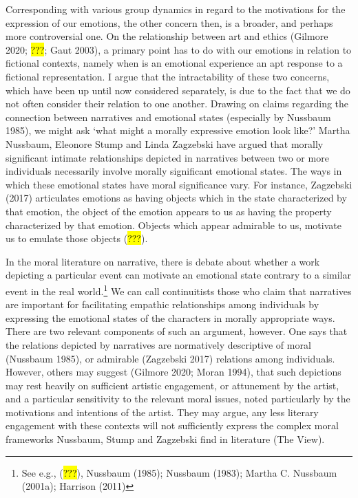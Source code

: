 \documentclass[
  letterpaper,
  DIV=11,
  numbers=noendperiod]{scrartcl}
\theoremstyle{remark}
\begin{document}
Corresponding with various group dynamics in regard to the motivations
for the expression of our emotions, the other concern then, is a
broader, and perhaps more controversial one. On the relationship between
art and ethics (Gilmore 2020; \hl{???}; Gaut 2003), a primary point has
to do with our emotions in relation to fictional contexts, namely when
is an emotional experience an apt response to a fictional
representation. I argue that the intractability of these two concerns,
which have been up until now considered separately, is due to the fact
that we do not often consider their relation to one another. Drawing on
claims regarding the connection between narratives and emotional states
(especially by Nussbaum 1985), we might ask `what might a morally
expressive emotion look like?' Martha Nussbaum, Eleonore Stump and Linda
Zagzebski have argued that morally significant intimate relationships
depicted in narratives between two or more individuals necessarily
involve morally significant emotional states. The ways in which these
emotional states have moral significance vary. For instance, Zagzebski
(2017) articulates emotions as having objects which in the state
characterized by that emotion, the object of the emotion appears to us
as having the property characterized by that emotion. Objects which
appear admirable to us, motivate us to emulate those objects (\hl{???}).

In the moral literature on narrative, there is debate about whether a
work depicting a particular event can motivate an emotional state
contrary to a similar event in the real world.\footnote{See e.g.,
  (\hl{???}), Nussbaum (1985); Nussbaum (1983); Martha C. Nussbaum
  (2001a); Harrison (2011)} We can call continuitists those who claim
that narratives are important for facilitating empathic relationships
among individuals by expressing the emotional states of the characters
in morally appropriate ways. There are two relevant components of such
an argument, however. One says that the relations depicted by narratives
are normatively descriptive of moral (Nussbaum 1985), or admirable
(Zagzebski 2017) relations among individuals. However, others may
suggest (Gilmore 2020; Moran 1994), that such depictions may rest
heavily on sufficient artistic engagement, or attunement by the artist,
and a particular sensitivity to the relevant moral issues, noted
particularly by the motivations and intentions of the artist. They may
argue, any less literary engagement with these contexts will not
sufficiently express the complex moral frameworks Nussbaum, Stump and
Zagzebski find in literature (The View).
\end{document}

